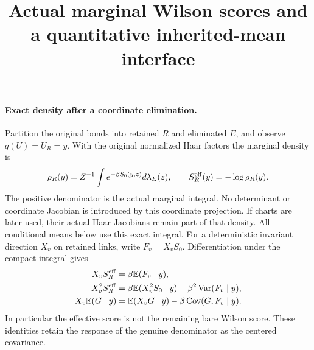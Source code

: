 \documentclass[11pt]{article}
\title{Actual marginal Wilson scores and a quantitative inherited-mean interface}\author{}\date{}
\newcommand{\E}{\mathbb E}
\newcommand{\Cov}{\operatorname{Cov}}
\newcommand{\Var}{\operatorname{Var}}
\begin{document}
\maketitle
\paragraph{Exact density after a coordinate elimination.}
Partition the original bonds into retained $R$ and eliminated $E$, and observe
$q(U)=U_R=y$. With the original normalized Haar factors the marginal density is
\[
 \rho_R(y)=Z^{-1}\int e^{-\beta S_0(y,z)}d\lambda_E(z),\qquad
 S_R^{\rm eff}(y)=-\log\rho_R(y).
\]
The positive denominator is the actual marginal integral. No determinant or coordinate
Jacobian is introduced by this coordinate projection. If charts are later used, their actual
Haar Jacobians remain part of that density. All conditional means below use this exact integral.
For a deterministic invariant direction $X_v$ on retained links, write $F_v=X_vS_0$.
Differentiation under the compact integral gives
\begin{align}
 X_vS_R^{\rm eff}&=\beta\E(F_v\mid y),\label{score}\\
 X_v^2S_R^{\rm eff}&=\beta\E(X_v^2S_0\mid y)-\beta^2\Var(F_v\mid y),\label{hessian}\\
 X_v\E(G\mid y)&=\E(X_vG\mid y)-\beta\Cov(G,F_v\mid y).\label{response}
\end{align}
In particular the effective score is not the remaining bare Wilson score.
These identities retain the response of the genuine denominator as the centered covariance.
\end{document}
